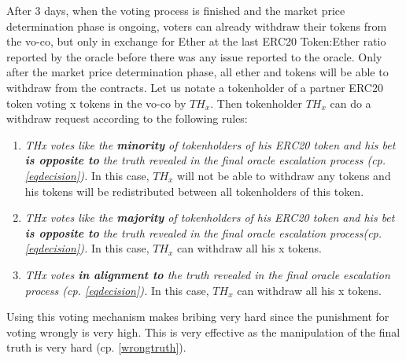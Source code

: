 \documentclass[a4paper]{article}
\begin{document}
After 3 days, when the voting process is finished and the market price determination phase is ongoing, voters can already withdraw their tokens from the vo-co, but only in exchange for Ether at the last ERC20 Token:Ether ratio reported by the oracle before there was any issue reported to the oracle.
Only after the market price determination phase, all ether and tokens will be able to withdraw from the contracts. Let us notate a tokenholder of a partner ERC20 token voting x tokens in the vo-co by $TH_x$.
Then tokenholder $TH_x$ can do a withdraw request according to the following rules:
\begin{enumerate}
\item \textit{THx votes like the \textbf{minority} of tokenholders of his ERC20 token and his bet \textbf{is opposite to} the truth revealed in the final oracle escalation process (cp. \ref{eqdecision}).}
In this case, $TH_x$ will not be able to withdraw any tokens and his tokens will be redistributed between all tokenholders of this token.


\item \textit{THx votes like the \textbf{majority} of tokenholders of his ERC20 token and his bet \textbf{is opposite to} the truth revealed in the final oracle escalation process(cp. \ref{eqdecision}).}
In this case, $TH_x$ can withdraw all his x tokens.
\item \textit{THx votes \textbf{in alignment to} the truth revealed in the final oracle escalation process (cp. \ref{eqdecision}).}
In this case, $TH_x$ can withdraw all his x tokens.
\end{enumerate}

Using this voting mechanism makes bribing very hard since the punishment for voting wrongly is very high. This is very effective as the manipulation of the final truth is very hard (cp. \ref{wrongtruth}).
\end{document}
